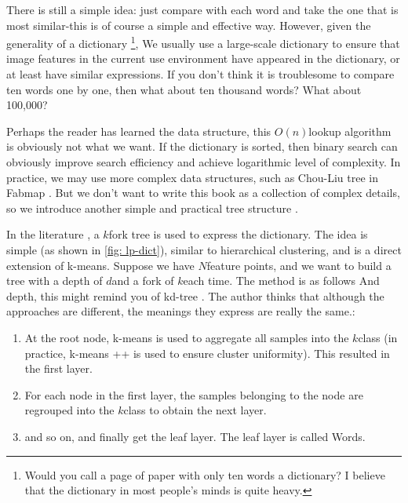 There is still a simple idea: just compare with each word and take the one that is most similar-this is of course a simple and effective way. However, given the generality of a dictionary \footnote{Would you call a page of paper with only ten words a dictionary? I believe that the dictionary in most people's minds is quite heavy. }, We usually use a large-scale dictionary to ensure that image features in the current use environment have appeared in the dictionary, or at least have similar expressions. If you don't think it is troublesome to compare ten words one by one, then what about ten thousand words? What about 100,000?

Perhaps the reader has learned the data structure, this $O (n) $lookup algorithm is obviously not what we want. If the dictionary is sorted, then binary search can obviously improve search efficiency and achieve logarithmic level of complexity. In practice, we may use more complex data structures, such as Chou-Liu tree \textsuperscript{\cite{Chow1968}} in Fabmap \textsuperscript{\cite{Cummins2008, Cummins2010, Cummins2011}}. But we don't want to write this book as a collection of complex details, so we introduce another simple and practical tree structure \textsuperscript{\cite{Galvez-Lopez2012}}.

In the literature \cite{Galvez-Lopez2012}, a $k $fork tree is used to express the dictionary. The idea is simple (as shown in \autoref{fig: lp-dict}), similar to hierarchical clustering, and is a direct extension of k-means. Suppose we have $N $feature points, and we want to build a tree with a depth of $d $and a fork of $k $each time. The method is as follows And depth, this might remind you of kd-tree \textsuperscript{\cite{Bentley1975}}. The author thinks that although the approaches are different, the meanings they express are really the same.:

\begin{mdframed}
\begin{enumerate}
\item At the root node, k-means is used to aggregate all samples into the $k $class (in practice, k-means ++ is used to ensure cluster uniformity). This resulted in the first layer.
\item For each node in the first layer, the samples belonging to the node are regrouped into the $k $class to obtain the next layer.
\item and so on, and finally get the leaf layer. The leaf layer is called Words.
\end{enumerate}
\end{mdframed}

